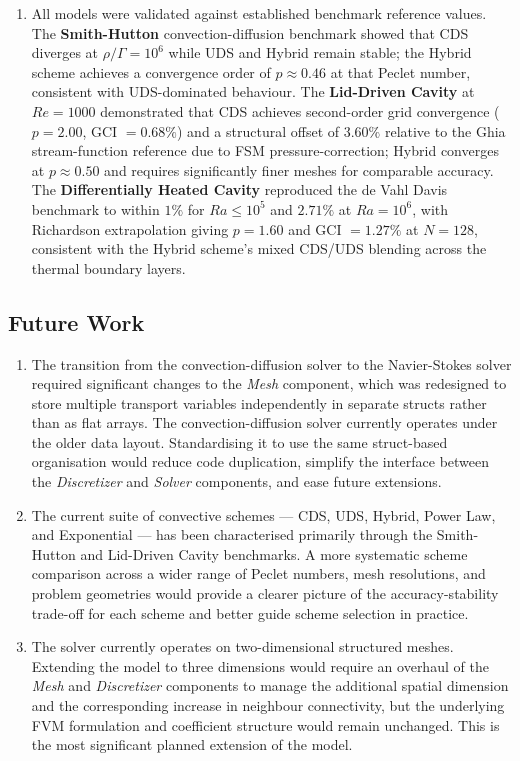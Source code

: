 \begin{enumerate}
    \item All models were validated against established benchmark reference values. The \textbf{Smith-Hutton} convection-diffusion benchmark showed that CDS diverges at $\rho/\Gamma = 10^6$ while UDS and Hybrid remain stable; the Hybrid scheme achieves a convergence order of $p \approx 0.46$ at that Peclet number, consistent with UDS-dominated behaviour. The \textbf{Lid-Driven Cavity} at $Re = 1000$ demonstrated that CDS achieves second-order grid convergence ($p = 2.00$, GCI $= 0.68\%$) and a structural offset of $3.60\%$ relative to the Ghia stream-function reference due to FSM pressure-correction; Hybrid converges at $p \approx 0.50$ and requires significantly finer meshes for comparable accuracy. The \textbf{Differentially Heated Cavity} reproduced the de Vahl Davis benchmark to within $1\%$ for $Ra \leq 10^5$ and $2.71\%$ at $Ra = 10^6$, with Richardson extrapolation giving $p = 1.60$ and GCI $= 1.27\%$ at $N = 128$, consistent with the Hybrid scheme's mixed CDS/UDS blending across the thermal boundary layers.
\end{enumerate}


\subsection*{Future Work}

\begin{enumerate}
    \item The transition from the convection-diffusion solver to the Navier-Stokes solver required significant changes to the \textit{Mesh} component, which was redesigned to store multiple transport variables independently in separate structs rather than as flat arrays. The convection-diffusion solver currently operates under the older data layout. Standardising it to use the same struct-based organisation would reduce code duplication, simplify the interface between the \textit{Discretizer} and \textit{Solver} components, and ease future extensions.

    \item The current suite of convective schemes — CDS, UDS, Hybrid, Power Law, and Exponential — has been characterised primarily through the Smith-Hutton and Lid-Driven Cavity benchmarks. A more systematic scheme comparison across a wider range of Peclet numbers, mesh resolutions, and problem geometries would provide a clearer picture of the accuracy-stability trade-off for each scheme and better guide scheme selection in practice.

    \item The solver currently operates on two-dimensional structured meshes. Extending the model to three dimensions would require an overhaul of the \textit{Mesh} and \textit{Discretizer} components to manage the additional spatial dimension and the corresponding increase in neighbour connectivity, but the underlying FVM formulation and coefficient structure would remain unchanged. This is the most significant planned extension of the model.
\end{enumerate}
